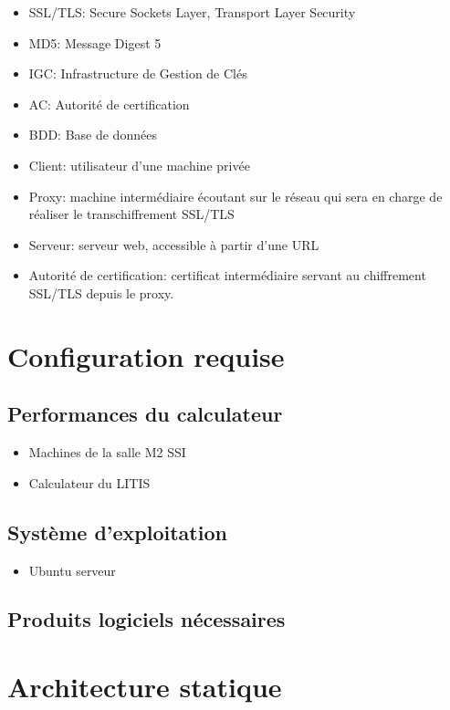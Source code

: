 \documentclass[a4paper,11pt,french]{article}
\begin{document}
\begin{itemize}
\item SSL/TLS: Secure Sockets Layer, Transport Layer Security 
\item MD5: Message Digest 5
\item IGC: Infrastructure de Gestion de Clés
\item AC: Autorité de certification
\item BDD: Base de données
\item Client: utilisateur d'une machine privée
\item Proxy: machine intermédiaire écoutant sur le réseau qui sera en charge de réaliser le transchiffrement SSL/TLS
\item Serveur: serveur web, accessible à partir d'une URL
\item Autorité de certification: certificat intermédiaire servant au chiffrement SSL/TLS depuis le proxy.
\end{itemize}


\section{Configuration requise}

\subsection{Performances du calculateur}

\begin{itemize}
\item Machines de la salle M2 SSI
\item Calculateur du LITIS
\end{itemize}

\subsection{Système d'exploitation}

\begin{itemize}
\item Ubuntu serveur
\end{itemize}

\subsection{Produits logiciels nécessaires}

\section{Architecture statique}
\end{document}
